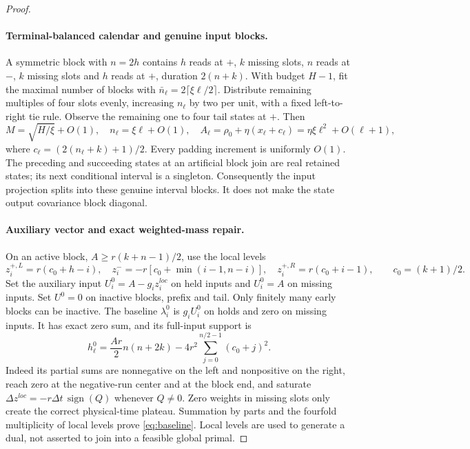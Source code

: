 \documentclass[11pt]{article}
\begin{document}
\begin{proof}
\paragraph{Terminal-balanced calendar and genuine input blocks.}
A symmetric block with $n=2h$ contains $h$ reads at $+$, $k$ missing slots,
$n$ reads at $-$, $k$ missing slots and $h$ reads at $+$, duration $2(n+k)$.
With budget $H-1$, fit the maximal number of blocks with
$\bar n_\ell=2\lceil\xi\ell/2\rceil$. Distribute remaining multiples of four
slots evenly, increasing $n_\ell$ by two per unit, with a fixed left-to-right
tie rule. Observe the remaining one to four tail states at $+$.
Then
\[
M=\sqrt{H/\xi}+O(1),\quad n_\ell=\xi\ell+O(1),\quad
A_\ell=\rho_0+\eta(x_\ell+c_\ell)=\eta\xi\ell^2+O(\ell+1),
\]
where $c_\ell=(2(n_\ell+k)+1)/2$.
Every padding increment is uniformly $O(1)$.
The preceding and succeeding states at an artificial block join are real
retained states; its next conditional interval is a singleton.
Consequently the input projection splits into these genuine interval blocks.
It does not make the state output covariance block diagonal.

\paragraph{Auxiliary vector and exact weighted-mass repair.}
On an active block, $A\ge r(k+n-1)/2$, use the local levels
\[
z_i^{+,L}=r(c_0+h-i),\quad
z_i^-=-r[c_0+\min(i-1,n-i)],\quad
z_i^{+,R}=r(c_0+i-1),\qquad c_0=(k+1)/2.
\]
Set the auxiliary input $U_i^0=A-g_i z_i^{loc}$ on held inputs and $U_i^0=A$
on missing inputs. Set $U^0=0$ on inactive blocks, prefix and tail.
Only finitely many early blocks can be inactive.
The baseline $\lambda_i^0$ is $g_iU_i^0$ on holds and zero on missing inputs.
It has exact zero sum, and its full-input support is
\begin{equation}\label{eq:baseline}
h_\ell^0=\frac{Ar}{2}n(n+2k)-4r^2\sum_{j=0}^{n/2-1}(c_0+j)^2.
\end{equation}
Indeed its partial sums are nonnegative on the left and nonpositive on the
right, reach zero at the negative-run center and at the block end, and saturate
$\Delta z^{loc}=-r\Delta t\,\operatorname{sign}(Q)$ whenever $Q\ne0$.
Zero weights in missing slots only create the correct physical-time plateau.
Summation by parts and the fourfold multiplicity of local levels prove
\eqref{eq:baseline}. Local levels are used to generate a dual, not asserted
to join into a feasible global primal.


\end{proof}
\end{document}
